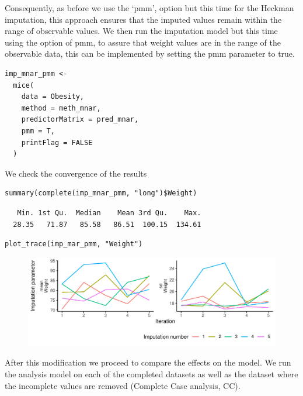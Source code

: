 \documentclass[
  article]{jss}
\begin{document}
Consequently, as before we use the `pmm', option but this time for the
Heckman imputation, this approach ensures that the imputed values remain
within the range of observable values. We then run the imputation model
but this time using the option of pmm, to assure that weight values are
in the range of the observable data, this can be implemented by setting
the pmm parameter to true.

\begin{verbatim}
imp_mnar_pmm <-
  mice(
    data = Obesity,
    method = meth_mnar,
    predictorMatrix = pred_mnar,
    pmm = T,
    printFlag = FALSE
  )
\end{verbatim}

We check the convergence of the results

\begin{verbatim}
summary(complete(imp_mnar_pmm, "long")$Weight)
\end{verbatim}

\begin{verbatim}
   Min. 1st Qu.  Median    Mean 3rd Qu.    Max. 
  28.35   71.87   85.58   86.51  100.15  134.61 
\end{verbatim}

\begin{verbatim}
plot_trace(imp_mar_pmm, "Weight")
\end{verbatim}

\begin{figure}[h]

{\centering \includegraphics{manuscript_files/figure-pdf/obesity-predmnarp1-1.pdf}

}

\end{figure}

After this modification we proceed to compare the effects on the model.
We run the analysis model on each of the completed datasets as well as
the dataset where the incomplete values are removed (Complete Case
analysis, CC).
\end{document}
